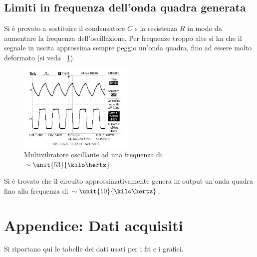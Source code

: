 \documentclass[10pt,a4paper]{article}
\begin{document}
{\subsection{Limiti in frequenza dell'onda quadra generata}
Si è provato a sostituire il condensatore $C$ e la resistenza $R$ in modo da aumentare la frequenza dell'oscillazione. Per frequenze troppo alte si ha che il segnale in uscita approssima sempre peggio un'onda quadra, fino ad essere molto deformato (si veda \figurename{~\ref{fig:scazzo}}).

\begin{figure}[H]
        \centering
        \includegraphics[width = 0.49\textwidth]{../oscilloscopio/multivibratore_scazzo.jpg}
        \caption{Multivibratore oscillante ad una frequenza di $\sim \unit{53}{\kilo\hertz}$}
        \label{fig:scazzo}
\end{figure}

Si è trovato che il circuito approssimativamente genera in output un'onda quadra fino alla frequenza di $\sim \unit{10}{\kilo\hertz}$.

\pagebreak
\section{Appendice: Dati acquisiti}
Si riportano qui le tabelle dei dati usati per i fit e i grafici.


}
\end{document}
